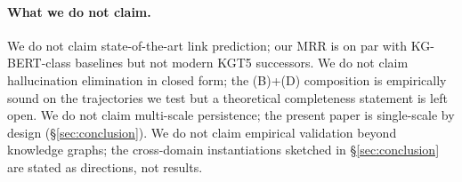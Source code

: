 \paragraph{What we do not claim.} We do not claim state-of-the-art link
prediction; our MRR is on par with KG-BERT-class baselines but not modern
KGT5 successors. We do not claim hallucination elimination in closed form;
the (B)+(D) composition is empirically sound on the trajectories we test
but a theoretical completeness statement is left open. We do not claim
multi-scale persistence; the present paper is single-scale by design
(\S\ref{sec:conclusion}). We do not claim empirical validation beyond
knowledge graphs; the cross-domain instantiations sketched in
\S\ref{sec:conclusion} are stated as directions, not results.
